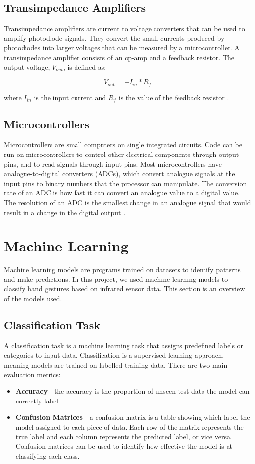 \documentclass[ oneside,%
                    author={Jack Jarvis},
                    degree={BSc},
                     title={FlexIR: Flexible PCB Wristbands for Infrared Based Gesture Recognition},
                    unit={COMS30045},
                    subtitle={Investigating the Effect of LED Viewing Angle on Gesture Classification in Infrared Sensing Systems}]{dissertation}
\begin{document}
\subsection{Transimpedance Amplifiers}
Transimpedance amplifiers are current to voltage converters that can be used to amplify photodiode signals. They convert the small currents produced by photodiodes into larger voltages that can be measured by a microcontroller. A transimpedance amplifier consists of an op-amp and a feedback resistor. The    output voltage, \(V_{out}\), is defined as:

\[V_{out} = -I_{in} * R_f\]

where \(I_{in}\) is the input current and \(R_f\) is the value of the feedback resistor \cite{TexasInstrumentsWhat1}.

\subsection{Microcontrollers}
Microcontrollers are small computers on single integrated circuits. Code can be run on microcontrollers to control other electrical components through output pins, and to read signals through input pins. Most microcontrollers have analogue-to-digital converters (ADCs), which convert analogue signals at the input pins to binary numbers that the processor can manipulate. The conversion rate of an ADC is how fast it can convert an analogue value to a digital value. The resolution of an ADC is the smallest change in an analogue signal that would result in a change in the digital output \cite{Broesch2008DigitalAccess}.

\section{Machine Learning}
Machine learning models are programs trained on datasets to identify patterns and make predictions. In this project, we used machine learning models to classify hand gestures based on infrared sensor data. This section is an overview of the models used.

\subsection{Classification Task}
A classification task is a machine learning task that assigns predefined labels or categories to input data. Classification is a supervised learning approach, meaning models are trained on labelled training data. There are two main evaluation metrics:
\begin{itemize}
    \item \textbf{Accuracy} - the accuracy is the proportion of unseen test data the model can correctly label
    \item \textbf{Confusion Matrices} - a confusion matrix is a table showing which label the model assigned to each piece of data. Each row of the matrix represents the true label and each column represents the predicted label, or vice versa. Confusion matrices can be used to identify how effective the model is at classifying each class.
\end{itemize}
\end{document}
